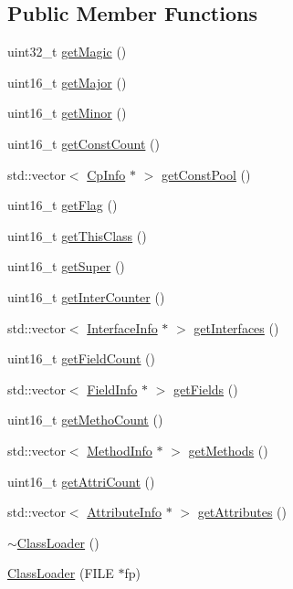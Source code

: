 \subsection*{Public Member Functions}
\begin{DoxyCompactItemize}
\item 
uint32\+\_\+t \hyperlink{class_class_loader_a31dd114820bfdbfe628f2efb5effe963}{get\+Magic} ()
\item 
uint16\+\_\+t \hyperlink{class_class_loader_afc67f7bffc1f2b8ffd61b1dd217f62ad}{get\+Major} ()
\item 
uint16\+\_\+t \hyperlink{class_class_loader_a9bed0bf2ac88a23118e67777a14c0553}{get\+Minor} ()
\item 
uint16\+\_\+t \hyperlink{class_class_loader_a292f4c53de8057b6cb24f8b2e0839807}{get\+Const\+Count} ()
\item 
std\+::vector$<$ \hyperlink{class_cp_info}{Cp\+Info} $\ast$ $>$ \hyperlink{class_class_loader_a8f3dc8367a76e7a4594bd5e8206d3977}{get\+Const\+Pool} ()
\item 
uint16\+\_\+t \hyperlink{class_class_loader_a6154ac807d01c4281f9ccf6b23378197}{get\+Flag} ()
\item 
uint16\+\_\+t \hyperlink{class_class_loader_a3346ccdf7148ea48826d858326c4de00}{get\+This\+Class} ()
\item 
uint16\+\_\+t \hyperlink{class_class_loader_a390d1849bd7686e618a84eae6a7f60cf}{get\+Super} ()
\item 
uint16\+\_\+t \hyperlink{class_class_loader_acbc3563bd386c769b5beb3352e761e0a}{get\+Inter\+Counter} ()
\item 
std\+::vector$<$ \hyperlink{class_interface_info}{Interface\+Info} $\ast$ $>$ \hyperlink{class_class_loader_a357668e5a1442f1fb7618f04c1e0a951}{get\+Interfaces} ()
\item 
uint16\+\_\+t \hyperlink{class_class_loader_a58c1c2b982f56c630946408d1425f6f4}{get\+Field\+Count} ()
\item 
std\+::vector$<$ \hyperlink{class_field_info}{Field\+Info} $\ast$ $>$ \hyperlink{class_class_loader_a868fdfc297bfc310b21b3a41cdceb7b9}{get\+Fields} ()
\item 
uint16\+\_\+t \hyperlink{class_class_loader_acad870c7b405146242912190e1e71f7c}{get\+Metho\+Count} ()
\item 
std\+::vector$<$ \hyperlink{struct_method_info}{Method\+Info} $\ast$ $>$ \hyperlink{class_class_loader_ad4733587ddbe1ae25500c13181bfb5ca}{get\+Methods} ()
\item 
uint16\+\_\+t \hyperlink{class_class_loader_a047f5d93000be571f23484c809ab9b2d}{get\+Attri\+Count} ()
\item 
std\+::vector$<$ \hyperlink{class_attribute_info}{Attribute\+Info} $\ast$ $>$ \hyperlink{class_class_loader_a988add3569e32d42bc841f526d978e68}{get\+Attributes} ()
\item 
\hyperlink{class_class_loader_a62db678abd7f6954fa2f32a6f5a0b157}{$\sim$\+Class\+Loader} ()
\item 
\hyperlink{class_class_loader_a94dec2f34055621437170b6a5fb74d0a}{Class\+Loader} (F\+I\+LE $\ast$fp)
\end{DoxyCompactItemize}
